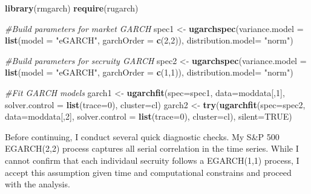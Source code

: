 \documentclass[]{elsarticle} %
\newenvironment{Shaded}{\begin{snugshade}}{\end{snugshade}}
\newcommand{\KeywordTok}[1]{\textcolor[rgb]{0.13,0.29,0.53}{\textbf{{#1}}}}
\newcommand{\DataTypeTok}[1]{\textcolor[rgb]{0.13,0.29,0.53}{{#1}}}
\newcommand{\DecValTok}[1]{\textcolor[rgb]{0.00,0.00,0.81}{{#1}}}
\newcommand{\StringTok}[1]{\textcolor[rgb]{0.31,0.60,0.02}{{#1}}}
\newcommand{\CommentTok}[1]{\textcolor[rgb]{0.56,0.35,0.01}{\textit{{#1}}}}
\newcommand{\OtherTok}[1]{\textcolor[rgb]{0.56,0.35,0.01}{{#1}}}
\newcommand{\NormalTok}[1]{{#1}}
\begin{document}
\begin{Shaded}
\begin{Highlighting}[]
\KeywordTok{library}\NormalTok{(rmgarch)}
\KeywordTok{require}\NormalTok{(rugarch)}

\CommentTok{#Build parameters for market GARCH}
        \NormalTok{spec1 <-}\StringTok{ }\KeywordTok{ugarchspec}\NormalTok{(}\DataTypeTok{variance.model =} \KeywordTok{list}\NormalTok{(}\DataTypeTok{model =} \StringTok{"eGARCH"}\NormalTok{, }\DataTypeTok{garchOrder =} \KeywordTok{c}\NormalTok{(}\DecValTok{2}\NormalTok{,}\DecValTok{2}\NormalTok{)),}
                                \DataTypeTok{distribution.model=} \StringTok{"norm"}\NormalTok{)}
        
\CommentTok{#Build parameters for secruity GARCH}
        \NormalTok{spec2 <-}\StringTok{ }\KeywordTok{ugarchspec}\NormalTok{(}\DataTypeTok{variance.model =} \KeywordTok{list}\NormalTok{(}\DataTypeTok{model =} \StringTok{"eGARCH"}\NormalTok{, }\DataTypeTok{garchOrder =} \KeywordTok{c}\NormalTok{(}\DecValTok{1}\NormalTok{,}\DecValTok{1}\NormalTok{)),}
                                \DataTypeTok{distribution.model=} \StringTok{"norm"}\NormalTok{)}

\CommentTok{#Fit GARCH models}
        \NormalTok{garch1 <-}\StringTok{ }\KeywordTok{ugarchfit}\NormalTok{(}\DataTypeTok{spec=}\NormalTok{spec1, }\DataTypeTok{data=}\NormalTok{moddata[,}\DecValTok{1}\NormalTok{], }\DataTypeTok{solver.control =} \KeywordTok{list}\NormalTok{(}\DataTypeTok{trace=}\DecValTok{0}\NormalTok{), }
                            \DataTypeTok{cluster=}\NormalTok{cl)}
        \NormalTok{garch2 <-}\StringTok{ }\KeywordTok{try}\NormalTok{(}\KeywordTok{ugarchfit}\NormalTok{(}\DataTypeTok{spec=}\NormalTok{spec2, }\DataTypeTok{data=}\NormalTok{moddata[,}\DecValTok{2}\NormalTok{], }\DataTypeTok{solver.control =} \KeywordTok{list}\NormalTok{(}\DataTypeTok{trace=}\DecValTok{0}\NormalTok{), }
                            \DataTypeTok{cluster=}\NormalTok{cl), }\DataTypeTok{silent=}\OtherTok{TRUE}\NormalTok{)}
\end{Highlighting}
\end{Shaded}

Before continuing, I conduct several quick diagnostic checks. My S\&P
500 EGARCH(2,2) process captures all serial correlation in the time
series. While I cannot confirm that each individaul secruity follows a
EGARCH(1,1) process, I accept this assumption given time and
computational constrains and proceed with the analysis.
\end{document}
